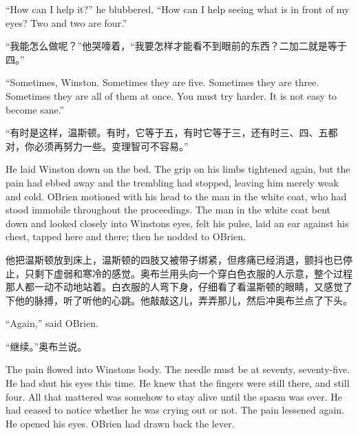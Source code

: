 \begin{paracol}{2}
\switchcolumn*

``How can I help it?'' he blubbered. ``How can I help seeing what is in
front of my eyes? Two and two are four.''

\switchcolumn

``我能怎么做呢？''他哭嚎着，``我要怎样才能看不到眼前的东西？二加二就是等于四。''

\switchcolumn*

``Sometimes, Winston. Sometimes they are five. Sometimes they are three.
Sometimes they are all of them at once. You must try harder. It is not
easy to become sane.''

\switchcolumn

``有时是这样，温斯顿。有时，它等于五，有时它等于三，还有时三、四、五都对，你必须再努力一些。变理智可不容易。''

\switchcolumn*

He laid Winston down on the bed. The grip on his limbs tightened again,
but the pain had ebbed away and the trembling had stopped, leaving him
merely weak and cold. O\textquotesingle Brien motioned with his head to
the man in the white coat, who had stood immobile throughout the
proceedings. The man in the white coat bent down and looked closely into
Winston\textquotesingle s eyes, felt his pulse, laid an ear against his
chest, tapped here and there; then he nodded to O\textquotesingle Brien.

\switchcolumn

他把温斯顿放到床上，温斯顿的四肢又被带子绑紧，但疼痛已经消退，颤抖也已停止，只剩下虚弱和寒冷的感觉。奥布兰用头向一个穿白色衣服的人示意，整个过程那人都一动不动地站着。白衣服的人弯下身，仔细看了看温斯顿的眼睛，又感觉了下他的脉搏，听了听他的心跳。他敲敲这儿，弄弄那儿，然后冲奥布兰点了下头。

\switchcolumn*

``Again,'' said O\textquotesingle Brien.

\switchcolumn

``继续。''奥布兰说。

\switchcolumn*

The pain flowed into Winston\textquotesingle s body. The needle must be
at seventy, seventy-five. He had shut his eyes this time. He knew that
the fingers were still there, and still four. All that mattered was
somehow to stay alive until the spasm was over. He had ceased to notice
whether he was crying out or not. The pain lessened again. He opened his
eyes. O\textquotesingle Brien had drawn back the lever.


\end{paracol}

